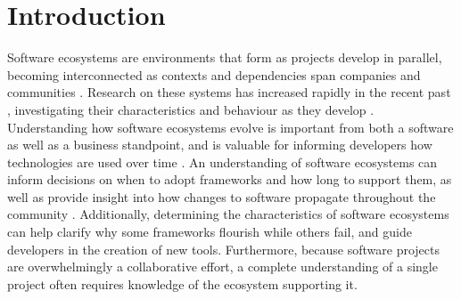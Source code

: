 \documentclass[10pt,conference]{IEEEtran}
\begin{document}
\section{Introduction}
Software ecosystems are environments that form as projects develop in parallel,
becoming interconnected as contexts and dependencies span companies and communities \cite{LUNGU2010264}. 
Research on these systems has increased rapidly in the recent past \cite{Manikas:2017}, investigating
their characteristics and behaviour as they develop \cite{Manikas:2013}. Understanding how software
ecosystems evolve is important from both a software as well as a business standpoint\cite{Messerschmitt},
and is valuable for informing developers how technologies are used over time \cite{Serebrenik:2015}. 
An understanding of software ecosystems can inform decisions on when to adopt frameworks and how long
to support them, as well as provide insight into how changes to software propagate throughout the community \cite{Wittern:2016}.
Additionally, determining the characteristics of software ecosystems 
can help clarify why some frameworks flourish while others fail, and guide 
developers in the creation of new tools\cite{Serebrenik:2015}. Furthermore, 
because software projects are overwhelmingly a collaborative effort, a complete
understanding of a single project often requires knowledge of the ecosystem supporting it\cite{Blincoe:2015}.
\end{document}
